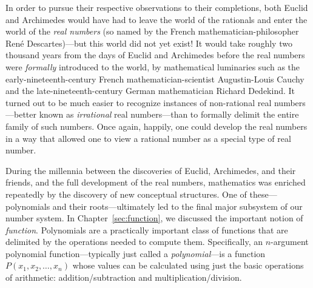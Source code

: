 In order to pursue their respective observations to their completions, both Euclid and Archimedes would have had to leave the world of the rationals and enter the world of the {\it real numbers} (so named by the French mathematician-philosopher Ren\'{e} Descartes)---but this world did not yet exist!  It would take roughly two thousand years from the days of Euclid and Archimedes before the real numbers were {\em formally} introduced to the world, by mathematical luminaries such as the early-nineteenth-century French mathematician-scientist Augustin-Louis Cauchy and the late-nineteenth-century German mathematician Richard Dedekind.  It turned out to be much easier to recognize instances of non-rational real numbers---better known as {\it irrational} real numbers---than to formally delimit the entire family of such numbers.  Once again, happily, one could develop the real numbers in a way that allowed one to view a rational number as a special type of real number.  

\medskip

 

During the millennia between the discoveries of Euclid, Archimedes, and their friends, and the full development of the real numbers, mathematics was enriched repeatedly by the discovery of new conceptual structures.  One of these---polynomials and their roots---ultimately led to the final major subsystem of our number system.  In Chapter~\ref{sec:function}, we discussed the important notion of {\em function}.  Polynomials are a practically important class of functions that are delimited by the operations needed to compute them.  Specifically, an $n$-argument polynomial function---typically just called a {\it polynomial}---is a function $P(x_1, x_2, \ldots, x_n)$ whose values can be calculated using just the basic operations of arithmetic: addition/subtraction and multiplication/division.

\bigskip


\noindent {}

